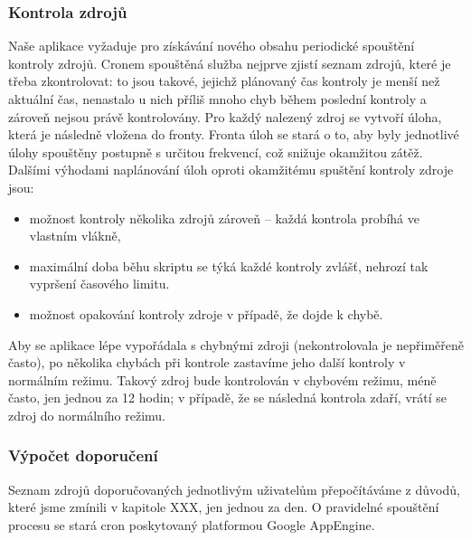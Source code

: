 \subsubsection{Kontrola zdrojů}

Naše aplikace vyžaduje pro získávání nového obsahu periodické spouštění kontroly zdrojů.
Cronem spouštěná služba nejprve zjistí seznam zdrojů, které je třeba zkontrolovat: to jsou takové, jejichž plánovaný čas kontroly je menší než aktuální čas, nenastalo u nich příliš mnoho chyb během poslední kontroly a zároveň nejsou právě kontrolovány.
Pro každý nalezený zdroj se vytvoří úloha, která je následně vložena do fronty.
Fronta úloh se stará o to, aby byly jednotlivé úlohy spouštěny postupně s určitou frekvencí, což snižuje okamžitou zátěž.
Dalšími výhodami naplánování úloh oproti okamžitému spuštění kontroly zdroje jsou:
\begin{itemize}
	\item možnost kontroly několika zdrojů zároveň -- každá kontrola probíhá ve vlastním vlákně,
	\item maximální doba běhu skriptu se týká každé kontroly zvlášť, nehrozí tak vypršení časového limitu.
	\item možnost opakování kontroly zdroje v případě, že dojde k chybě.
\end{itemize}

Aby se aplikace lépe vypořádala s chybnými zdroji (nekontrolovala je nepřiměřeně často), po několika chybách při kontrole zastavíme jeho další kontroly v normálním režimu.
Takový zdroj bude kontrolován v chybovém režimu, méně často, jen jednou za 12 hodin; v případě, že se následná kontrola zdaří, vrátí se zdroj do normálního režimu.

\subsubsection{Výpočet doporučení}

Seznam zdrojů doporučovaných jednotlivým uživatelům přepočítáváme z důvodů, které jsme zmínili v kapitole XXX, jen jednou za den.
O pravidelné spouštění procesu se stará cron poskytovaný platformou Google AppEngine.

